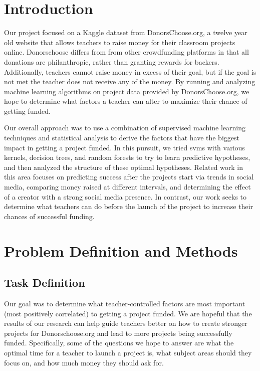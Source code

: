 \documentclass{article}
\begin{document}
 


\section{Introduction}
Our project focused on a Kaggle dataset from DonorsChoose.org, a twelve year old website that allows teachers to raise money for their classroom projects online. Donorschoose differs from from other crowdfunding platforms in that all donations are philanthropic, rather than granting rewards for backers. Additionally, teachers cannot raise money in excess of their goal, but if the goal is not met the teacher does not receive any of the money. By running and analyzing machine learning algorithms on project data provided by DonorsChoose.org, we hope to determine what factors a teacher can alter to maximize their chance of getting funded. 

Our overall approach was to use a combination of supervised machine learning techniques and statistical analysis to derive the factors that have the biggest impact in getting a project funded. In this pursuit, we tried svms with various kernels, decision trees, and random forests to try to learn predictive hypotheses, and then analyzed the structure of these optimal hypotheses. Related work in this area focuses on predicting success after the projects start via trends in social media, comparing money raised at different intervals, and determining the effect of a creator with a strong social media presence. In contrast, our work seeks to determine what teachers can do before the launch of the project to increase their chances of successful funding. 

\section{Problem Definition and Methods} 
\subsection{Task Definition}
Our goal was to determine what teacher-controlled factors are most important (most positively correlated) to getting a project funded. We are hopeful that the results of our research can help guide teachers better on how to create stronger projects for Donorschoose.org and lead to more projects being successfully funded. Specifically, some of the questions we hope to answer are what the optimal time for a teacher to launch a project is, what subject areas should they focus on, and how much money they should ask for. 
\end{document}
